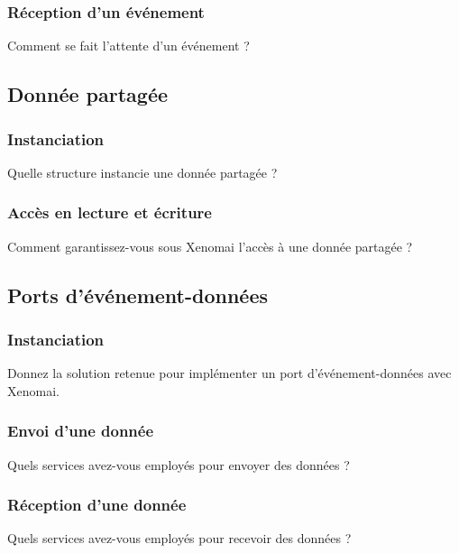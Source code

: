 \documentclass[11pt, a4paper]{paper}
\begin{document}
\subsubsection{Réception d’un événement}
 {\color{blue} Comment se fait l'attente d'un événement ?}

\subsection{Donnée partagée}

\subsubsection{Instanciation}
 {\color{blue} Quelle structure instancie une donnée partagée ?}

\subsubsection{Accès en lecture et écriture}
 {\color{blue} Comment garantissez-vous sous Xenomai l'accès à une donnée partagée ?}

\subsection{Ports d’événement-données}

\subsubsection{Instanciation}
 {\color{blue} Donnez la solution retenue pour implémenter un port d'événement-données avec Xenomai.}

\subsubsection{Envoi d’une donnée}
 {\color{blue} Quels services avez-vous employés pour envoyer des données ?}

\subsubsection{Réception d’une donnée}
 {\color{blue} Quels services avez-vous employés pour recevoir des données ?}
 
\end{document}
